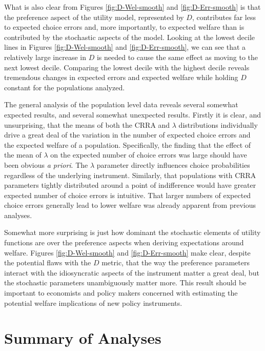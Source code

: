 \documentclass[../main.tex]{subfiles}
\begin{document}
What is also clear from Figures \ref{fig:D-Wel-smooth} and \ref{fig:D-Err-smooth} is that the preference aspect of the utility model, represented by $D$, contributes far less to expected choice errors and, more importantly, to expected welfare than is contributed by the stochastic aspects of the model.
Looking at the lowest decile lines in Figures \ref{fig:D-Wel-smooth} and \ref{fig:D-Err-smooth}, we can see that a relatively large increase in $D$ is needed to cause the same effect as moving to the next lowest decile.
Comparing the lowest decile with the highest decile reveals tremendous changes in expected errors and expected welfare while holding $D$ constant for the populations analyzed.

The general analysis of the population level data reveals several somewhat expected results, and several somewhat unexpected results.
Firstly it is clear, and unsurprising, that the means of both the CRRA and $\lambda$ distributions individually drive a great deal of the variation in the number of expected choice errors and the expected welfare of a population.
Specifically, the finding that the effect of the mean of $\lambda$ on the expected number of choice errors was large should have been obvious \textit{a priori}.
The $\lambda$ parameter directly influences choice probabilities regardless of the underlying instrument.
Similarly, that populations with CRRA parameters tightly distributed around a point of indifference would have greater expected number of choice errors is intuitive.
That larger numbers of expected choice errors generally lead to lower welfare was already apparent from previous analyses.

Somewhat more surprising is just how dominant the stochastic elements of utility functions are over the preference aspects when deriving expectations around welfare.
Figures \ref{fig:D-Wel-smooth} and \ref{fig:D-Err-smooth} make clear, despite the potential flaws with the $D$ metric, that the way the preference parameters interact with the idiosyncratic aspects of the instrument matter a great deal, but the stochastic parameters unambiguously matter more.
This result should be important to economists and policy makers concerned with estimating the potential welfare implications of new policy instruments.

\singlespacing
\section{Summary of Analyses}
\doublespacing
\end{document}
